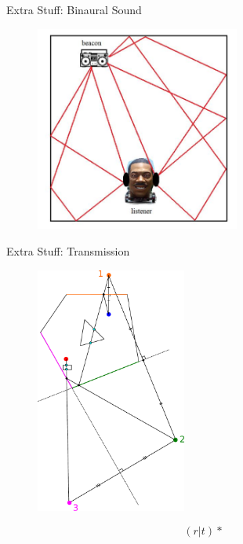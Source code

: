 \documentclass{beamer}
\begin{document}
\begin{frame}{Extra Stuff: Binaural Sound}

\begin{figure}[t]
\centering
\includegraphics[width=0.6\textwidth]{BinauralSound.png}
\end{figure}


\end{frame}

\begin{frame}{Extra Stuff: Transmission}

\begin{figure}[t]
\centering
\includegraphics[width=0.44\textwidth]{ImageSources2MultiDrawn4_Transmission.pdf}
\end{figure}

\[(r|t)*\]

\end{frame}
\end{document}
